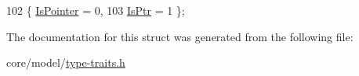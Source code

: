\begin{DoxyCode}
102             \{ \hyperlink{structTypeTraits_1_1PointerTraits_3_01ns3_1_1Ptr_3_01U_01_4_01_4_a54d8da47ad5bb02b8af0b2a95d5a3597a65017526e1da76dc0083f526b9263ede}{IsPointer} = 0,          
103                           \hyperlink{structTypeTraits_1_1PointerTraits_3_01ns3_1_1Ptr_3_01U_01_4_01_4_a54d8da47ad5bb02b8af0b2a95d5a3597a0c3ce85112b5ec9aed69e63e6abe7b66}{IsPtr} = 1               \};
\end{DoxyCode}


The documentation for this struct was generated from the following file\+:\begin{DoxyCompactItemize}
\item 
core/model/\hyperlink{type-traits_8h}{type-\/traits.\+h}\end{DoxyCompactItemize}
